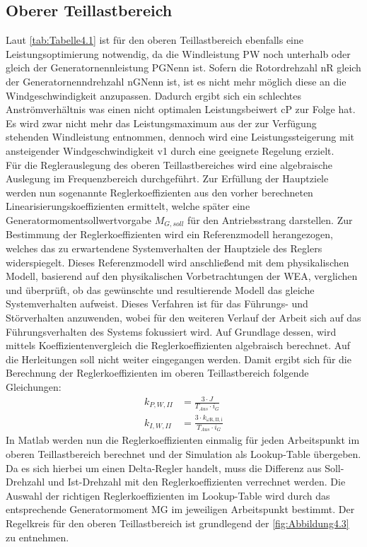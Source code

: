 \subsection{Oberer Teillastbereich}
Laut \autoref{tab:Tabelle4.1} ist für den oberen Teillastbereich ebenfalls eine Leistungsoptimierung notwendig, da die Windleistung \acs{PW} noch unterhalb oder gleich der Generatornennleistung \acs{PGNenn} ist. Sofern die Rotordrehzahl \acs{nR} gleich der Generatornenndrehzahl \acs{nGNenn} ist, ist es nicht mehr möglich diese an die Windgeschwindigkeit anzupassen. Dadurch ergibt sich ein schlechtes Anströmverhältnis was einen nicht optimalen Leistungsbeiwert \acs{cP} zur Folge hat. Es wird zwar nicht mehr das Leistungsmaximum aus der zur Verfügung stehenden Windleistung entnommen, dennoch wird eine Leistungssteigerung mit ansteigender Windgeschwindigkeit \acs{v1} durch eine geeignete Regelung erzielt.\\
Für die Reglerauslegung des oberen Teillastbereiches wird eine algebraische Auslegung im Frequenzbereich durchgeführt. Zur Erfüllung der Hauptziele werden nun sogenannte Reglerkoeffizienten aus den vorher berechneten Linearisierungskoeffizienten ermittelt, welche später eine Generatormomentsollwertvorgabe $M_{G,soll}$ für den Antriebsstrang darstellen. Zur Bestimmung der Reglerkoeffizienten wird ein Referenzmodell herangezogen, welches das zu erwartendene Systemverhalten der Hauptziele des Reglers widerspiegelt. Dieses Referenzmodell wird anschließend mit dem physikalischen Modell, basierend auf den physikalischen Vorbetrachtungen der WEA, verglichen und überprüft, ob das gewünschte und resultierende Modell das gleiche Systemverhalten aufweist. Dieses Verfahren ist für das Führungs- und Störverhalten anzuwenden, wobei für den weiteren Verlauf der Arbeit sich auf das Führungsverhalten des Systems fokussiert wird. Auf Grundlage dessen, wird mittels Koeffizientenvergleich die Reglerkoeffizienten algebraisch berechnet. Auf die Herleitungen soll nicht weiter eingegangen werden. Damit ergibt sich für die Berechnung der Reglerkoeffizienten im oberen Teillastbereich folgende Gleichungen:
\begin{align}
    k_{P,W,II} &= \frac{3 \cdot J}{T_{Aus} \cdot i_G}   \label{eq:Gleichung4.11}\\
    k_{I,W,II} &= \frac{3 \cdot k_{\omega\mathrm{R,II,i}}}{T_{Aus} \cdot i_G}\label{eq:Gleichung4.12}
\end{align}
\newline
In Matlab werden nun die Reglerkoeffizienten einmalig für jeden Arbeitspunkt im oberen Teillastbereich berechnet und der Simulation als Lookup-Table übergeben. Da es sich hierbei um einen Delta-Regler handelt, muss die Differenz aus Soll-Drehzahl und Ist-Drehzahl mit den Reglerkoeffizienten verrechnet werden. Die Auswahl der richtigen Reglerkoeffizienten im Lookup-Table wird durch das entsprechende Generatormoment \acs{MG} im jeweiligen Arbeitspunkt bestimmt. Der Regelkreis für den oberen Teillastbereich ist grundlegend der \autoref{fig:Abbildung4.3} zu entnehmen.

